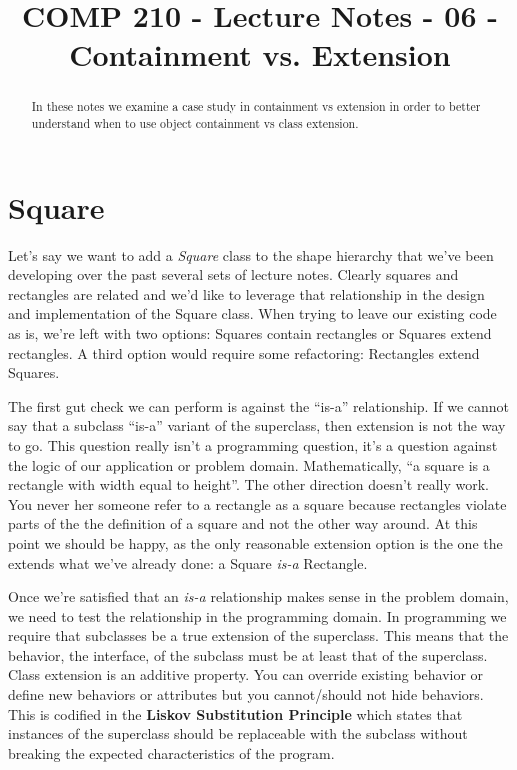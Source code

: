 \documentclass[]{tufte-handout}
\title{COMP 210 - Lecture Notes - 06 - Containment vs. Extension}
\begin{document}
\maketitle

\begin{abstract}
In these notes we examine a case study in containment vs extension in order to better understand when to use object containment vs class extension.
\end{abstract}

\section{Square}

Let's say we want to add a \textit{Square} class to the shape hierarchy that we've been developing over the past several sets of lecture notes. Clearly squares and rectangles are related and we'd like to leverage that relationship in the design and implementation of the Square class. When trying to leave our existing code as is, we're left with two options: Squares contain rectangles or Squares extend rectangles. A third option would require some refactoring: Rectangles extend Squares. 

The first gut check we can perform is against the ``is-a'' relationship. If we cannot say that a subclass ``is-a'' variant of the superclass, then extension is not the way to go. This question really isn't a programming question, it's a question against the logic of our application or problem domain. Mathematically, ``a square is a rectangle with width equal to height''.  The other direction doesn't really work. You never her someone refer to a rectangle as a square because rectangles violate parts of the the definition of a square and not the other way around. At this point we should be happy, as the only reasonable extension option is the one the extends what we've already done: a Square \textit{is-a} Rectangle. 

Once we're satisfied that an \textit{is-a} relationship makes sense in the problem domain, we need to test the relationship in the programming domain. In programming we require that subclasses be a true extension of the superclass. This means that the behavior, the interface, of the subclass must be at least that of the superclass.  Class extension is an additive property. You can override existing behavior or define new behaviors or attributes but you cannot/should not hide behaviors.  This is codified in the \textbf{Liskov Substitution Principle} which states that instances of the superclass should be replaceable with the subclass without breaking the expected characteristics of the program. 
\end{document}
